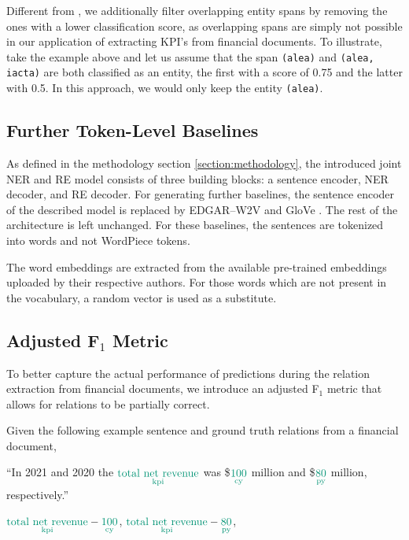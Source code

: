 \documentclass[conference, table]{IEEEtran}
\newcommand{\1} {\mathbbm{1}}
\begin{document}
Different from \cite{eberts2019span}, we additionally filter overlapping entity spans by removing the ones with a lower classification score, as overlapping spans are simply not possible in our application of extracting KPI's from financial documents. To illustrate, take the example above and let us assume that the span \texttt{(alea)} and \texttt{(alea, iacta)} are both classified as an entity, the first with a score of 0.75 and the latter with 0.5. In this approach, we would only keep the entity \texttt{(alea)}.

\subsection{Further Token-Level Baselines}
\label{subsection:furtherbaselines}

As defined in the methodology section \ref{section:methodology}, the introduced joint NER and RE model consists of three building blocks: a sentence encoder, NER decoder, and RE decoder. For generating further baselines, the sentence encoder of the described model is replaced by EDGAR--W2V \cite{loukas2021edgar} and GloVe \cite{pennington2014glove}.
The rest of the architecture is left unchanged. For these baselines, the sentences are tokenized into words and not WordPiece tokens. 


The word embeddings are extracted from the available pre-trained embeddings uploaded by their respective authors. For those words which are not present in the vocabulary, a random vector is used as a substitute. 

\subsection{Adjusted F$_1$ Metric}
\label{subsection:adjustedf1}

To better capture the actual performance of predictions during the relation extraction from financial documents, we introduce an adjusted F$_1$ metric that allows for relations to be partially correct.

Given the following example sentence and ground truth relations from a financial document,
\begin{tcolorbox}[notitle,boxrule=0pt,
boxsep=0pt,left=0.6em,right=0.6em,top=0.5em,bottom=0.5em,
colback=gray!10,
colframe=gray!10]
``In 2021 and 2020 the $\underset{\text{{\color{fhgreen}{kpi}}}}{\text{{\color{fhgreen}{total net revenue}}}}$ was \$$\underset{\text{{\color{fhgreen}{cy}}}}{\text{{\color{fhgreen}{100}}}}$ million and \$$\underset{\text{{\color{fhgreen}{py}}}}{\text{{\color{fhgreen}{80}}}}$ million, respectively.''

\hfill \break
$\underset{\text{{\color{fhgreen}{kpi}}}}{\text{{\color{fhgreen}{total net revenue}}}} - \underset{\text{{\color{fhgreen}{cy}}}}{\text{{\color{fhgreen}{100}}}}$,
$\underset{\text{{\color{fhgreen}{kpi}}}}{\text{{\color{fhgreen}{total net revenue}}}} - \underset{\text{{\color{fhgreen}{py}}}}{\text{{\color{fhgreen}{80}}}}$,
\end{tcolorbox}
\end{document}
